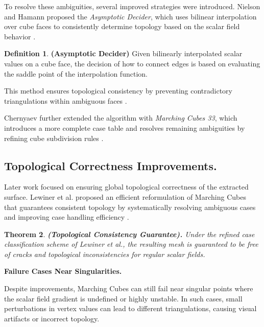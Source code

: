 \documentclass[12pt, a4paper, oneside]{book}
\theoremstyle{plain}
\newtheorem{theorem}{Theorem}[chapter]
\theoremstyle{definition}
\newtheorem{definition}[theorem]{Definition}
\theoremstyle{remark}
\theoremstyle{definition}
\begin{document}
To resolve these ambiguities, several improved strategies were introduced. Nielson and Hamann proposed the \emph{Asymptotic Decider}, which uses bilinear interpolation over cube faces to consistently determine topology based on the scalar field behavior \cite{nielson1991asymptotic}.

\begin{definition}
    \textbf{(Asymptotic Decider)}
Given bilinearly interpolated scalar values on a cube face, the decision of how to connect edges is based on evaluating the saddle point of the interpolation function.
\end{definition}


This method ensures topological consistency by preventing contradictory triangulations within ambiguous faces \cite{nielson1991asymptotic}.

\vspace{0.5em}

Chernyaev further extended the algorithm with \emph{Marching Cubes 33}, which introduces a more complete case table and resolves remaining ambiguities by refining cube subdivision rules \cite{chernyaev1995marching}.

\vspace{0.5em}

\subsection{Topological Correctness Improvements.}

Later work focused on ensuring global topological correctness of the extracted surface. Lewiner et al. proposed an efficient reformulation of Marching Cubes that guarantees consistent topology by systematically resolving ambiguous cases and improving case handling efficiency \cite{lewiner2003efficient}.

\begin{theorem}
    \textbf{ (Topological Consistency Guarantee).}
Under the refined case classification scheme of Lewiner et al., the resulting mesh is guaranteed to be free of cracks and topological inconsistencies for regular scalar fields.
\end{theorem}


\vspace{0.5em}

\textbf{Failure Cases Near Singularities.}

Despite improvements, Marching Cubes can still fail near singular points where the scalar field gradient is undefined or highly unstable. In such cases, small perturbations in vertex values can lead to different triangulations, causing visual artifacts or incorrect topology.
\end{document}
